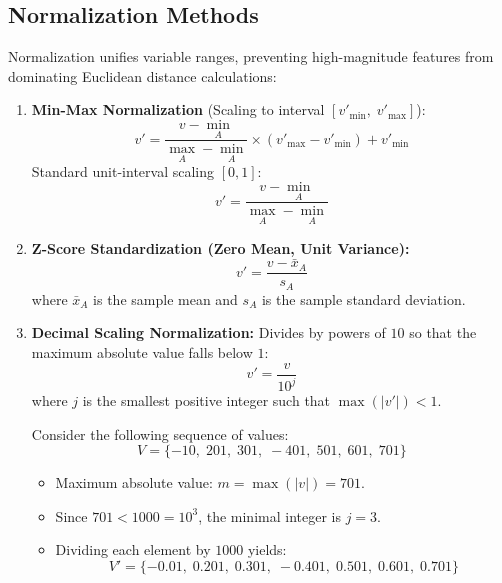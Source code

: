 \FloatBarrier

\subsection{Normalization Methods}
Normalization unifies variable ranges, preventing high-magnitude features from dominating Euclidean distance calculations:

\begin{enumerate}
    \item \textbf{Min-Max Normalization} (Scaling to interval $[v'_{\min}, \; v'_{\max}]$):
    \begin{equation}
    v' = \frac{v - \min_A}{\max_A - \min_A} \times (v'_{\max} - v'_{\min}) + v'_{\min}
    \end{equation}
    Standard unit-interval scaling $[0, 1]$:
    \begin{equation}
    v' = \frac{v - \min_A}{\max_A - \min_A}
    \end{equation}

    \item \textbf{Z-Score Standardization (Zero Mean, Unit Variance):}
    \begin{equation}
    v' = \frac{v - \bar{x}_A}{s_A}
    \end{equation}
    where $\bar{x}_A$ is the sample mean and $s_A$ is the sample standard deviation.

    \item \textbf{Decimal Scaling Normalization:}
    Divides by powers of $10$ so that the maximum absolute value falls below $1$:
    \begin{equation}
    v' = \frac{v}{10^j}
    \end{equation}
    where $j$ is the smallest positive integer such that $\max(|v'|) < 1$.
    \begin{example}
    Consider the following sequence of values:
    \begin{equation*}
    V = \{-10, \; 201, \; 301, \; -401, \; 501, \; 601, \; 701\}
    \end{equation*}
    \begin{itemize}
        \item Maximum absolute value: $m = \max(|v|) = 701$.
        \item Since $701 < 1000 = 10^3$, the minimal integer is $j = 3$.
        \item Dividing each element by $1000$ yields:
        \begin{equation}
        V' = \{-0.01, \; 0.201, \; 0.301, \; -0.401, \; 0.501, \; 0.601, \; 0.701\}
        \end{equation}
    \end{itemize}
    \end{example}
\end{enumerate}

